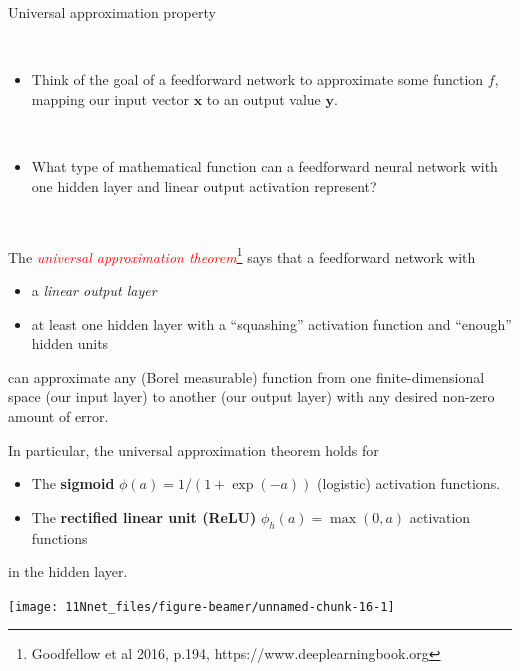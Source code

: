 \documentclass[10pt,ignorenonframetext,]{beamer}
\providecommand{\tightlist}{%
  \setlength{\itemsep}{0pt}\setlength{\parskip}{0pt}}
\begin{document}
\begin{frame}

\begin{block}{Universal approximation property}

\(~\)

\begin{itemize}
\tightlist
\item
  Think of the goal of a feedforward network to approximate some
  function \(f\), mapping our input vector \({\boldsymbol x}\) to an
  output value \({\boldsymbol y}\).
\end{itemize}

\(~\)

\begin{itemize}
\tightlist
\item
  What type of mathematical function can a feedforward neural network
  with one hidden layer and linear output activation represent?
\end{itemize}

\(~\) \pause

The
\emph{\textcolor{red}{universal approximation theorem}}\footnote{Goodfellow et al 2016, p.194, https://www.deeplearningbook.org}
says that a feedforward network with \vspace{2mm}

\begin{itemize}
\tightlist
\item
  a \emph{linear output layer}
\item
  at least one hidden layer with a ``squashing'' activation function and
  ``enough'' hidden units
\end{itemize}

\vspace{2mm}

can approximate any (Borel measurable) function from one
finite-dimensional space (our input layer) to another (our output layer)
with any desired non-zero amount of error.

\end{block}

\end{frame}

\begin{frame}

In particular, the universal approximation theorem holds for

\begin{itemize}
\tightlist
\item
  The \textbf{sigmoid} \(\phi(a)=1/(1+\exp(-a))\) (logistic) activation
  functions.
\item
  The \textbf{rectified linear unit (ReLU)} \(\phi_h(a)=\max(0,a)\)
  activation functions
\end{itemize}

in the hidden layer.

\center

\texttt{[image: 11Nnet\_files/figure-beamer/unnamed-chunk-16-1]}

\end{frame}
\end{document}
